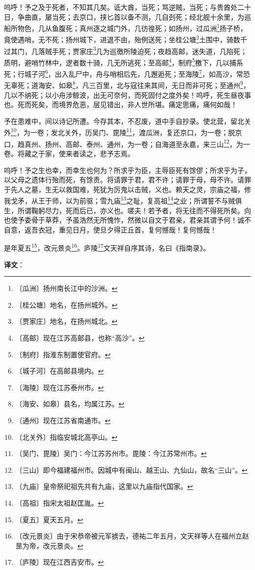\documentclass[12pt,UTF-8,openany]{ctexbook}
\begin{document}
\begin{normalsize}
    呜呼！予之及于死者，不知其几矣。诋大酋，当死；骂逆贼，当死；与贵酋处二十日，争曲直，屡当死；去京口，挟匕首以备不测，几自刭死；经北舰十余里，为巡船所物色，几从鱼腹死；真州逐之城门外，几彷徨死；如扬州，过瓜洲\footnote{〔瓜洲〕扬州南长江中的沙洲。}扬子桥，竟使遇哨，无不死；扬州城下，进退不由，殆例送死；坐桂公塘\footnote{〔桂公塘〕地名，在扬州城外。}土围中，骑数千过其门，几落贼手死；贾家庄\footnote{〔贾家庄〕地名，在扬州城北。}几为巡徼所陵迫死；夜趋高邮，迷失道，几陷死；质明，避哨竹林中，逻者数十骑，几无所逃死；至高邮\footnote{〔高邮〕现在江苏高邮县，也称“高沙”。}，制府\footnote{〔制府〕指淮东制置使官府。}檄下，几以捕系死；行城子河\footnote{〔城子河〕在高邮县境内。}，出入乱尸中，舟与哨相后先，几邂逅死；至海陵\footnote{〔海陵〕现在江苏泰州市。}，如高沙，常恐无辜死；道海安、如皋\footnote{〔海安、如皋〕县名，均属江苏。}，凡三百里，北与寇往来其间，无日而非可死；至通州\footnote{〔通州〕现在江苏省南通市。}，几以不纳死；以小舟涉鲸波，出无可奈何，而死固付之度外矣！呜呼，死生昼夜事也。死而死矣，而境界危恶，层见错出，非人世所堪。痛定思痛，痛何如哉！
    
    予在患难中，间以诗记所遭。今存其本，不忍废，道中手自抄录。使北营，留北关外\footnote{〔北关外〕指临安城北高亭山。}，为一卷；发北关外，历吴门、毘陵\footnote{〔吴门、毘陵〕吴门：今江苏苏州市。毘陵：今江苏常州市。}，渡瓜洲，复还京口，为一卷；脱京口，趋真州、扬州、高邮、泰州、通州，为一卷；自海道至永嘉，来三山\footnote{〔三山〕即今福建福州市。因城中有闽山、越王山、九仙山，故名“三山”。}，为一卷。将藏之于家，使来者读之，悲予志焉。
    
    呜呼！予之生也幸，而幸生也何为？所求乎为臣，主辱臣死有馀僇；所求乎为子，以父母之遗体行殆而死，有馀责。将请罪于君，君不许；请罪于母，母不许。请罪于先人之墓，生无以救国难，死犹为厉鬼以击贼，义也。赖天之灵，宗庙之福，修我戈矛，从王于师，以为前驱；雪九庙\footnote{〔九庙〕皇帝祭祀祖先共有九庙，这里以九庙指代国家。}之耻，复高祖\footnote{〔高祖〕指宋太祖赵匡胤。}之业；所谓誓不与贼俱生，所谓鞠躬尽力，死而后已，亦义也。嗟夫！若予者，将无往而不得死所矣。向也使予委骨于草莽，予虽浩然无所愧怍，然微以自文于君亲，君亲其谓予何！诚不自意，返吾衣冠，重见日月，使旦夕得正丘首，复何憾哉！复何憾哉！
    
    是年夏五\footnote{〔夏五〕夏天五月。}，改元景炎\footnote{〔改元景炎〕由于宋恭帝被元军掳去，德祐二年五月，文天祥等人在福州立赵昰为帝，改元景炎。}。庐陵\footnote{〔庐陵〕现在江西吉安市。}文天祥自序其诗，名曰《指南录》。
\end{normalsize}


\newpage

\textbf{译文}：
\end{document}
